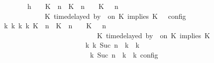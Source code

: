 \begin{isabellebody}
\ \ \ \ \ \ \isamarkupfalse%
\ {\isacharminus}\isanewline
\ \ \ \ \ \ \ \ \isamarkupfalse%
\ h{}{\isacharcolon}\ {\isacartoucheopen}{\isasymrho}\ {\isasymin}\ {\isasymlbrakk}\ {\isacharparenleft}{\isacharparenleft}K\ {\isasymUp}\ n{\isacharparenright}\ {\isacharhash}\ {\isacharparenleft}K\ {\isacharat}\ n\ {\isasymoplus}\ {\isasymdelta}{\isasymtau}\ {\isasymRightarrow}\ K\ {\isacharhash}\ {\isasymGamma}{\isacharparenright}{\isacharcomma}\ n\isanewline
\ \ \ \ \ \ \ \ \ \ \ \ \ \ \ \ \ \ \ \ {\isasymturnstile}\ {\isasymPsi}\ {\isasymtriangleright}\ {\isacharparenleft}{\isacharparenleft}K\ time{\isacharminus}delayed\ by\ {\isasymdelta}{\isasymtau}\ on\ K\ implies\ K\ {\isacharhash}\ {\isasymPhi}{\isacharparenright}\ {\isasymrbrakk}\isactrlsub c\isactrlsub o\isactrlsub n\isactrlsub f\isactrlsub i\isactrlsub g{\isacartoucheclose}\isanewline
\ \ \ \ \ \ \ \ \isamarkupfalse%
\ \isamarkupfalse%
\ {\isacartoucheopen}{\isasymexists}{\isasymGamma}\isactrlsub k\ {\isasymPsi}\isactrlsub k\ {\isasymPhi}\isactrlsub k\ k{\isachardot}\ {\isacharparenleft}{\isacharparenleft}{\isacharparenleft}{\isacharparenleft}K\ {\isasymUp}\ n{\isacharparenright}\ {\isacharhash}\ {\isacharparenleft}K\ {\isacharat}\ n\ {\isasymoplus}\ {\isasymdelta}{\isasymtau}\ {\isasymRightarrow}\ K\ {\isacharhash}\ {\isasymGamma}{\isacharparenright}{\isacharcomma}\ n\isanewline
\ \ \ \ \ \ \ \ \ \ \ \ \ \ \ \ \ \ \ \ \ \ \ \ \ \ \ \ \ \ \ \ \ \ \ {\isasymturnstile}\ {\isasymPsi}\ {\isasymtriangleright}\ {\isacharparenleft}{\isacharparenleft}K\ time{\isacharminus}delayed\ by\ {\isasymdelta}{\isasymtau}\ on\ K\ implies\ K\ {\isacharhash}\ {\isasymPhi}{\isacharparenright}{\isacharparenright}\isanewline
\ \ \ \ \ \ \ \ \ \ \ \ \ \ \ \ \ \ \ \ \ \ \ \ \ \ \ \ \ \ \ \ \ {\isasymhookrightarrow}\isactrlbsup k\isactrlesup \ {\isacharparenleft}{\isasymGamma}\isactrlsub k{\isacharcomma}\ Suc\ n\ {\isasymturnstile}\ {\isasymPsi}\isactrlsub k\ {\isasymtriangleright}\ {\isasymPhi}\isactrlsub k{\isacharparenright}{\isacharparenright}\isanewline
\ \ \ \ \ \ \ \ \ \ \ \ \ \ \ \ \ \ \ \ \ \ \ \ \ \ \ \ \ \ \ \ {\isasymand}\ {\isasymrho}\ {\isasymin}\ {\isasymlbrakk}\ {\isasymGamma}\isactrlsub k{\isacharcomma}\ Suc\ n\ {\isasymturnstile}\ {\isasymPsi}\isactrlsub k\ {\isasymtriangleright}\ {\isasymPhi}\isactrlsub k\ {\isasymrbrakk}\isactrlsub c\isactrlsub o\isactrlsub n\isactrlsub f\isactrlsub i\isactrlsub g{\isacartoucheclose}\isanewline

\end{isabellebody}
